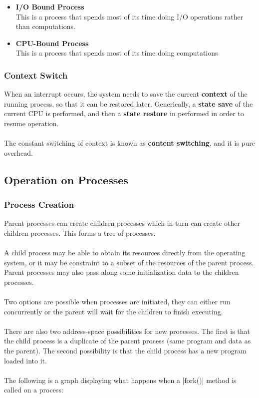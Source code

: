\documentclass{article}
\begin{document}
\begin{itemize}
	\item \textbf{I/O Bound Process}
	\vspace{.2cm} \\
	This is a process that spends most of its time doing I/O operations rather than computations.
	
	\item \textbf{CPU-Bound Process}
	\vspace{.2cm} \\
	This is a process that spends most of its time doing computations
\end{itemize}

\subsubsection{Context Switch}
When an interrupt occurs, the system needs to save the current \textbf{context} of the running process, so that it can be restored later. Generically, a \textbf{state save} of the current CPU is performed, and then a \textbf{state restore} in performed in order to resume operation. \\ \\
The constant switching of context is known as \textbf{content switching}, and it is pure overhead.

\subsection{Operation on Processes}

\subsubsection{Process Creation}
Parent processes can create children processes which in turn can create other children processes. This forms a tree of processes. \\ \\
A child process may be able to obtain its resources directly from the operating system, or it may be constraint to a subset of the resources of the parent process. Parent processes may also pass along some initialization data to the children processes. \\ \\
Two options are possible when processes are initiated, they can either run concurrently or the parent will wait for the children to finish executing. \\ \\
There are also two address-space possibilities for new processes. The first is that the child process is a duplicate of the parent process (same program and data as the parent). The second possibility is that the child process has a new program loaded into it. \\ \\
The following is a graph displaying what happens when a \cverb|fork()| method is called on a process: \\ \\
\end{document}
